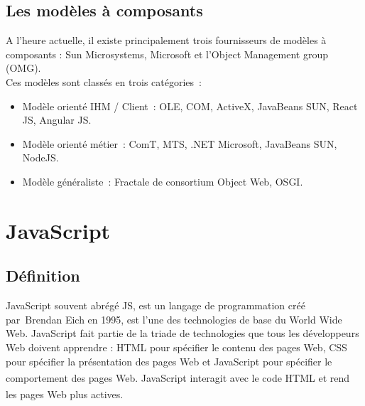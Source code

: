 \documentclass[12pt]{report}
\begin{document}
\subsection{Les modèles à composants}
\hspace*{0.16in}
A l’heure actuelle, il existe principalement trois fournisseurs de modèles à composants : Sun Microsystems, Microsoft et l’Object Management group (OMG).
\\
Ces modèles sont classés en trois catégories :

\begin{itemize}
    \item Modèle orienté IHM / Client : OLE, COM, ActiveX, JavaBeans SUN, React JS, Angular JS.
    \item Modèle orienté métier : ComT, MTS, .NET Microsoft, JavaBeans SUN, NodeJS.
    \item Modèle généraliste : Fractale de consortium Object Web, OSGI.
\end{itemize}

\newpage

\section{JavaScript}
\subsection{Définition}
\vspace{0.1in}
\hspace*{0.16in}
JavaScript souvent abrégé JS, est un langage de programmation créé par Brendan Eich en 1995, est l’une des technologies de base du World Wide Web. JavaScript fait partie de la triade de technologies que tous les développeurs Web doivent apprendre : HTML pour spécifier le contenu des pages Web, CSS pour spécifier la présentation des pages Web et JavaScript pour spécifier le comportement des pages Web. \textsuperscript{\cite{flanagan2013javascript}}
JavaScript interagit avec le code HTML et rend les pages Web plus actives. \textsuperscript{\cite{paulson2005building}}
\end{document}

